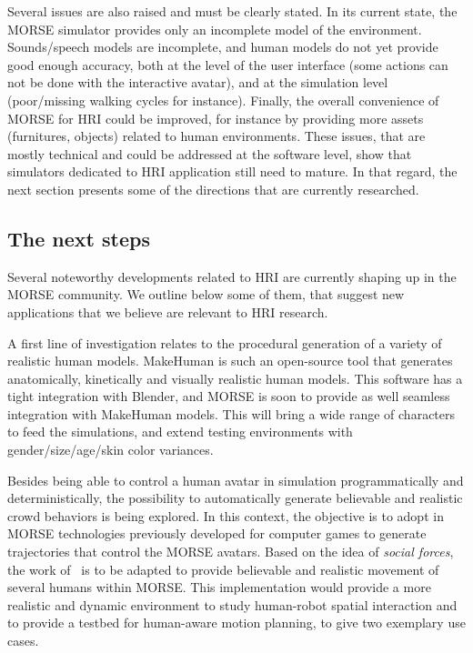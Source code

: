 \documentclass{llncs}
\begin{document}
Several issues are also raised and must be clearly stated. In its current state,
the MORSE simulator provides only an incomplete model of the environment.
Sounds/speech models are incomplete, and human models do not yet provide good
enough accuracy, both at the level of the user interface (some actions can not
be done with the interactive avatar), and at the simulation level (poor/missing
walking cycles for instance). Finally, the overall convenience of MORSE for HRI
could be improved, for instance by providing more assets (furnitures, objects)
related to human environments. These issues, that are mostly technical and could
be addressed at the software level, show that simulators dedicated to HRI
application still need to mature. In that regard, the next section presents some
of the directions that are currently researched.

\subsection*{The next steps}

Several noteworthy developments related to HRI are currently shaping up in the
MORSE community. We outline below some of them, that suggest new applications
that we believe are relevant to HRI research.

A first line of investigation relates to the procedural generation of a variety
of realistic human models. {\sc MakeHuman} is such an open-source tool that
generates anatomically, kinetically and visually realistic human models. This
software has a tight integration with Blender, and MORSE is soon to provide as
well seamless integration with {\sc MakeHuman} models. This will bring a wide
range of characters to feed the simulations, and extend testing environments
with gender/size/age/skin color variances.

Besides being able to control a human avatar in simulation programmatically and
deterministically, the possibility to automatically generate believable and
realistic crowd behaviors is being explored. In this context, the objective is
to adopt in MORSE technologies previously developed for computer games to generate
trajectories that control the MORSE avatars. Based on the idea of \emph{social
forces}, the work of~\cite{Szymanezyk2012crowd} is to be
adapted to provide believable and realistic movement of several humans within
MORSE. This
implementation would provide a more realistic and dynamic environment to study
human-robot spatial interaction and to provide a testbed for human-aware motion
planning, to give two exemplary use cases.
\end{document}
